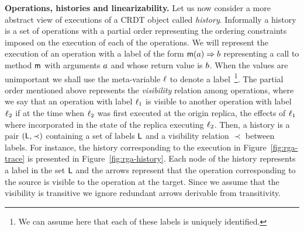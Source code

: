 \smallskip
\noindent
{\bf Operations, histories and linearizability.}
Let us now consider a more abstract view of executions of a 
CRDT object called \emph{history}.
%
Informally a history is a set of operations with a partial order
representing the ordering constraints imposed on the execution of each
of the operations.
%
We will represent the execution of an operation with a label of the
form $\mathsf{m}(a) \Rightarrow b$ representing a call to method
$\mathsf{m}$ with arguments $a$ and whose return value is $b$.
%
When the values are unimportant we shall use the meta-variable
$\ell$ to denote a label~\footnote{We can assume here that each of these labels is uniquely identified.}.
%
The partial order mentioned above represents the \emph{visibility} relation among operations, where we say that an
operation with label $\ell_1$ is visible to another operation with
label $\ell_2$ if at the time when $\ell_2$ was first executed
at the origin replica, the effects of $\ell_1$ where incorporated
in the state of the replica executing $\ell_2$.
%
Then, a history is a pair $(\mathsf{L}, \prec)$ containing a
set of labels $\mathsf{L}$ and a visibility relation $\prec$ between labels. 
%
For instance, the history %
corresponding to the execution in Figure~\ref{fig:rga-trace} 
is presented in Figure~\ref{fig:rga-history}.
%
Each node of the history represents a label in the set $\mathsf{L}$
and the arrows represent that the operation corresponding to the
source is visible to the operation at the target.
%
Since we assume that the visibility is transitive we ignore
redundant arrows derivable from transitivity.

